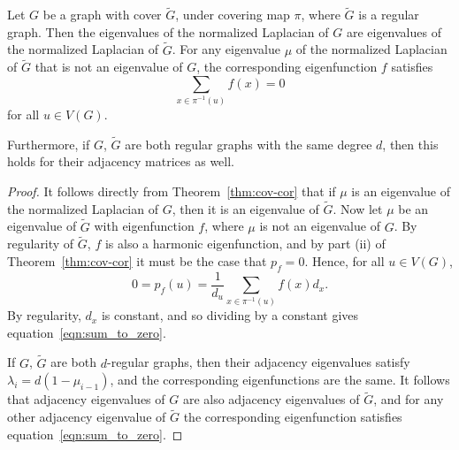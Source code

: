 \begin{corollary}\label{cor:cov-cor}
  Let $G$ be a graph with cover $\tilde{G}$, under covering map $\pi$,
  where $\tilde{G}$ is a regular graph.  Then the eigenvalues of
  the normalized Laplacian of $G$ are eigenvalues of the normalized Laplacian
  of $\tilde{G}$.  For any eigenvalue $\mu$ of the normalized Laplacian
  of $\tilde{G}$ that is not an eigenvalue of $G$, the corresponding eigenfunction
  $f$ satisfies
 \begin{equation}\label{eqn:sum_to_zero}
  \sum_{x \in \pi^{-1}(u)} f(x) = 0
 \end{equation}
 for all $u \in V(G)$.


 Furthermore, if $G$, $\tilde{G}$ are both regular graphs with the
 same degree $d$, then this holds
 for their adjacency matrices as well. 
\end{corollary}
\begin{proof}
  It follows directly from Theorem~\ref{thm:cov-cor} that if $\mu$ is an eigenvalue
  of the normalized Laplacian of $G$, then it is an eigenvalue of $\tilde{G}$.  Now
  let $\mu$ be an eigenvalue of $\tilde{G}$ with eigenfunction $f$, where $\mu$
  is not an eigenvalue of $G$.  By regularity
  of $\tilde{G}$, $f$ is also a harmonic eigenfunction, and by part (ii) of Theorem~\ref{thm:cov-cor}
  it must be the case that $p_f = 0$.  Hence, for all $u \in V(G)$,
  \[ 0 =  p_f(u) = \displaystyle \frac{1}{d_u} \sum_{x \in \pi^{-1}(u)} f(x) d_x .\]
  By regularity, $d_x$ is constant, and so dividing by a constant gives equation~\ref{eqn:sum_to_zero}.


  If $G$, $\tilde{G}$ are both $d$-regular graphs, then their adjacency eigenvalues satisfy
  $\lambda_i = d(1-\mu_{i-1})$, and the corresponding eigenfunctions are the same.  It follows
  that adjacency eigenvalues of $G$ are also adjacency eigenvalues of $\tilde{G}$, and for
  any other adjacency eigenvalue of $\tilde{G}$ the corresponding eigenfunction satisfies
  equation~\ref{eqn:sum_to_zero}.  
\end{proof}

